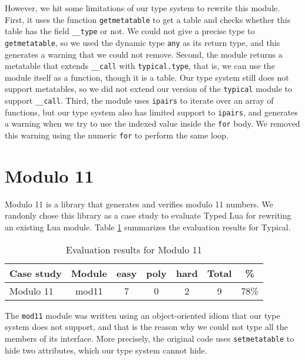 However, we hit some limitations of our type system to rewrite this module.
First, it uses the function \texttt{getmetatable} to get a table and
checks whether this table has the field \texttt{\string_\string_type} or not.
We could not give a precise type to \texttt{getmetatable}, so we used the dynamic
type \texttt{any} as its return type, and this generates a warning that we could not
remove.
Second, the module returns a metatable that extends \texttt{\string_\string_call}
with \texttt{typical.type}, that is, we can use the module itself as a function,
though it is a table.
Our type system still does not support metatables, so we did not extend our version
of the \texttt{typical} module to support \texttt{\string_\string_call}.
Third, the module uses \texttt{ipairs} to iterate over an array of functions,
but our type system also has limited support to \texttt{ipairs}, and generates
a warning when we try to use the indexed value inside the \texttt{for} body.
We removed this warning using the numeric \texttt{for} to perform the same loop.

\section{Modulo 11}

Modulo 11 \citep{luamod11} is a library that generates and verifies
modulo 11 numbers.
We randonly chose this library as a case study to evaluate Typed Lua
for rewriting an existing Lua module.
Table \ref{tab:evalmod11} summarizes the evaluation results for Typical.

\begin{table}[!ht]
\begin{center}
\begin{tabular}{|l|c|c|c|c|c|c|}
\hline
\textbf{Case study} & \textbf{Module} & \textbf{easy} & \textbf{poly} & \textbf{hard} & \textbf{Total} & \textbf{\%} \\
\hline
\multirow{1}{*}{Modulo 11}
& mod11 & 7 & 0 & 2 & 9 & 78\% \\
\hline
\end{tabular}
\end{center}
\caption{Evaluation results for Modulo 11}
\label{tab:evalmod11}
\end{table}

The \texttt{mod11} module was written using an object-oriented idiom that
our type system does not support, and that is the reason why we could not
type all the members of its interface.
More precisely, the original code uses \texttt{setmetatable} to hide
two attributes, which our type system cannot hide.

